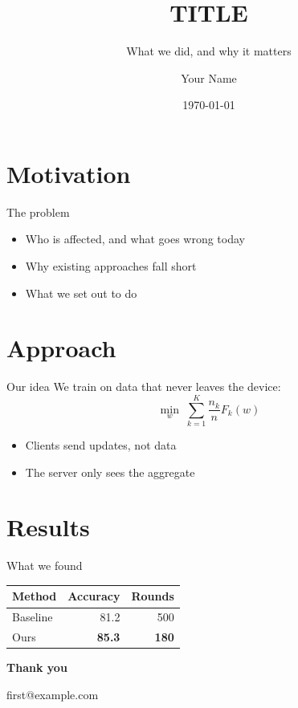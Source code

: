 \documentclass[11pt,aspectratio=169]{beamer}
\title{{{TITLE}}}
\subtitle{What we did, and why it matters}
\author{Your Name}
\institute{University One}
\date{\today}
\begin{document}
\begin{frame}[plain]
  \titlepage
\end{frame}

\section{Motivation}

\begin{frame}{The problem}
  \begin{itemize}
    \item Who is affected, and what goes wrong today
    \item Why existing approaches fall short
    \item What we set out to do
  \end{itemize}
\end{frame}

\section{Approach}

\begin{frame}{Our idea}
  We train on data that never leaves the device:
  \[
    \min_{w} \; \sum_{k=1}^{K} \frac{n_k}{n} F_k(w)
  \]
  \begin{itemize}
    \item Clients send updates, not data
    \item The server only sees the aggregate
  \end{itemize}
\end{frame}

\section{Results}

\begin{frame}{What we found}
  \centering
  \begin{tabular}{lrr}
    \toprule
    Method & Accuracy & Rounds \\
    \midrule
    Baseline & 81.2 & 500 \\
    Ours & \textbf{85.3} & \textbf{180} \\
    \bottomrule
  \end{tabular}
\end{frame}

\begin{frame}[plain]
  \centering\vfill
  {\Huge\bfseries Thank you}\par\vspace{0.6em}
  {\color{muted}first@example.com}
  \vfill
\end{frame}
\end{document}
